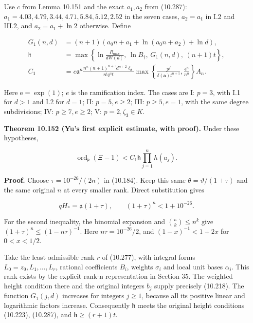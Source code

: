\documentclass[
  11pt,
  a4paper,
]{article}
\begin{document}
Use \(c\) from Lemma 10.151 and the exact \(a_1,a_2\) from (10.287):
\(a_1=4.03,4.79,3.44,4.71,5.84,5.12,2.52\) in the seven cases,
\(a_2=a_1\) in I.2 and III.2, and \(a_2=a_1+\ln2\) otherwise. Define

\[
\begin{aligned}
G_1(n,d)&=(n+1)(a_0n+a_1+\ln(a_0n+a_2)+\ln d),\\
\mathsf h&=\max\left\{
\ln\frac{R_{\max}}{dW(d)},\ \ln B_\dagger,
\ G_1(n,d),\ (n+1)t\right\},\\
C_1&=c\mathfrak a^n
\frac{n^n(n+1)^{n+1}d^{n+2}\ell_d}{n!q^ut}
\max\left\{\frac{p^f}{\delta(\boldsymbol a)t^{n+1}},
                   \frac{\mathrm e^n}{n^n}\right\}A_n.
\end{aligned}
\tag{10.449}
\]

Here \(\mathrm e=\exp(1)\); \(e\) is the ramification index. The cases
are I: \(p=3\), with I.1 for \(d>1\) and I.2 for \(d=1\); II:
\(p=5,e\ge2\); III: \(p\ge5,e=1\), with the same degree subdivisions;
IV: \(p\ge7,e\ge2\); V: \(p=2,\zeta_3\in K\).

\textbf{Theorem 10.152 (Yu's first explicit estimate, with proof).}
Under these hypotheses,

\[
\operatorname{ord}_{\mathfrak p}(\Xi-1)
<C_1\mathsf h\prod_{j=1}^nh(a_j).
\tag{10.450}
\]

\textbf{Proof.} Choose \(\tau=10^{-26}/(2n)\) in (10.184). Keep this
same \(\theta=\vartheta/(1+\tau)\) and the same original \(n\) at every
smaller rank. Direct substitution gives

\[
qH_*=\mathfrak a(1+\tau),\qquad
(1+\tau)^n<1+10^{-26}.
\tag{10.451}
\]

For the second inequality, the binomial expansion and
\(\binom nk\le n^k\) give \((1+\tau)^n\le(1-n\tau)^{-1}\). Here
\(n\tau=10^{-26}/2\), and \((1-x)^{-1}<1+2x\) for \(0<x<1/2\).

Take the least admissible rank \(r\) of (10.277), with integral forms
\(L_0=z_0,L_1,\ldots,L_r\), rational coefficients \(B_i\), weights
\(\sigma_i\) and local unit bases \(\alpha_i\). This rank exists by the
explicit rank-n representation in Section 35. The weighted height
condition there and the original integers \(b_j\) supply precisely
(10.218). The function \(G_1(j,d)\) increases for integers \(j\ge1\),
because all its positive linear and logarithmic factors increase.
Consequently \(\mathsf h\) meets the original height conditions
(10.223), (10.287), and \(\mathsf h\ge(r+1)t\).
\end{document}
